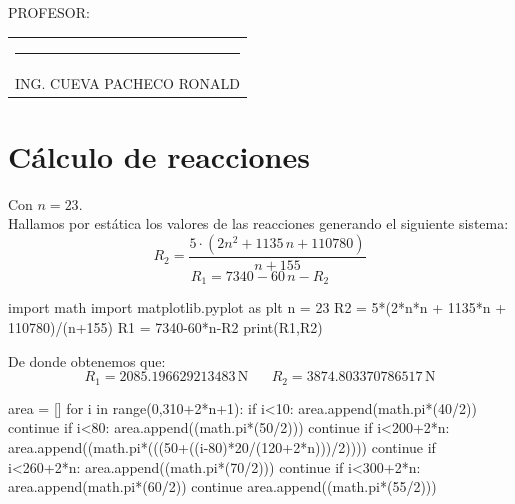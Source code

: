 \documentclass[a4paper,11pt]{report}
\begin{document}
{\large PROFESOR:} \\[2cm]
\begin{center}
\begin{tabular}{c}
\rule[3pt]{4.8in}{1pt}\\[1pt]
ING. CUEVA PACHECO RONALD
\end{tabular}
\end{center}
\vfill
\newpage
\tableofcontents
\newpage
{} %
\setcounter{page}{1}  %
\chapter*{Cálculo de reacciones}
Con $n = 23$.\\
Hallamos por estática los valores de las reacciones generando el siguiente sistema:
$$
R_{2} = \frac{5\cdot(2n^{2} + 1135\,n + 110780)}{n+155}
$$
$$
R_{1} = 7340 - 60\,n - R_{2}
$$
\begin{pyglist}[language=python,caption={Cálculo de reacciones},style=tango]
import math
import matplotlib.pyplot as plt
n = 23
R2 = 5*(2*n*n + 1135*n + 110780)/(n+155)
R1 = 7340-60*n-R2
print(R1,R2)
\end{pyglist}
De donde obtenemos que:
$$
R_{1} = 2085.196629213483\,\mathrm{N} \hspace{20pt} R_{2} = 3874.803370786517\,\mathrm{N}
$$
\begin{pyglist}[language=python,caption={Cálculo del área},style=tango]
area = []
for i in range(0,310+2*n+1):
    if i<10:
        area.append(math.pi*(40/2))
        continue
    if i<80:
        area.append((math.pi*(50/2)))
        continue
    if i<200+2*n:
        area.append((math.pi*(((50+((i-80)*20/(120+2*n)))/2))))
        continue
    if i<260+2*n:
        area.append((math.pi*(70/2)))
        continue
    if i<300+2*n:
        area.append(math.pi*(60/2))
        continue
    area.append((math.pi*(55/2)))
\end{pyglist}
\end{document}
